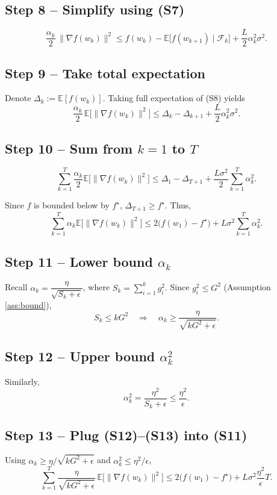 \documentclass{article}
\newcommand{\E}{\mathbb{E}}
\begin{document}
\subsection*{Step 8 – Simplify using (S7)}
\[
\frac{\alpha_{k}}{2}\,\|\nabla f(w_{k})\|^{2}
\le f(w_{k})-\E\!\big[f(w_{k+1})\mid\mathcal{F}_{k}\big]
+\frac{L}{2}\alpha_{k}^{2}\sigma^{2}.
\tag{S8}
\]

\subsection*{Step 9 – Take total expectation}
Denote $\Delta_{k}:= \E[f(w_{k})]$. Taking full expectation of (S8) yields
\[
\frac{\alpha_{k}}{2}\,\E\!\big[\|\nabla f(w_{k})\|^{2}\big]
\le \Delta_{k}-\Delta_{k+1}
+\frac{L}{2}\alpha_{k}^{2}\sigma^{2}.
\tag{S9}
\]

\subsection*{Step 10 – Sum from $k=1$ to $T$}
\[
\sum_{k=1}^{T}\frac{\alpha_{k}}{2}\E\!\big[\|\nabla f(w_{k})\|^{2}\big]
\le \Delta_{1}-\Delta_{T+1}
+\frac{L\sigma^{2}}{2}\sum_{k=1}^{T}\alpha_{k}^{2}.
\tag{S10}
\]

Since $f$ is bounded below by $f^{\star}$, $\Delta_{T+1}\ge f^{\star}$.
Thus,
\[
\sum_{k=1}^{T}\alpha_{k}\E\!\big[\|\nabla f(w_{k})\|^{2}\big]
\le 2\big(f(w_{1})-f^{\star}\big)
+L\sigma^{2}\sum_{k=1}^{T}\alpha_{k}^{2}.
\tag{S11}
\]

\subsection*{Step 11 – Lower bound $\alpha_{k}$}
Recall $\alpha_{k}= \dfrac{\eta}{\sqrt{S_{k}+\epsilon}}$, where $S_{k}=\sum_{i=1}^{k}g_{i}^{2}$.
Since $g_{i}^{2}\le G^{2}$ (Assumption \ref{ass:bound}),
\[
S_{k}\le kG^{2}\quad\Longrightarrow\quad
\alpha_{k}\ge \frac{\eta}{\sqrt{kG^{2}+\epsilon}}.
\tag{S12}
\]

\subsection*{Step 12 – Upper bound $\alpha_{k}^{2}$}
Similarly,
\[
\alpha_{k}^{2}= \frac{\eta^{2}}{S_{k}+\epsilon}\le\frac{\eta^{2}}{\epsilon}.
\tag{S13}
\]

\subsection*{Step 13 – Plug (S12)–(S13) into (S11)}
Using $\alpha_{k}\ge \eta/\sqrt{kG^{2}+\epsilon}$ and $\alpha_{k}^{2}\le \eta^{2}/\epsilon$,
\[
\sum_{k=1}^{T}\frac{\eta}{\sqrt{kG^{2}+\epsilon}}\,
\E\!\big[\|\nabla f(w_{k})\|^{2}\big]
\le 2\big(f(w_{1})-f^{\star}\big)
+L\sigma^{2}\frac{\eta^{2}}{\epsilon}T.
\tag{S14}
\]
\end{document}
